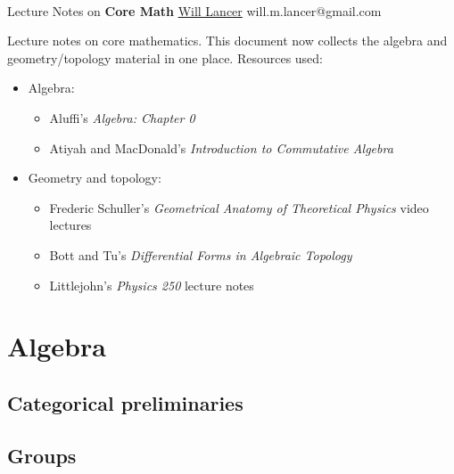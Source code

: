 \documentclass[11pt]{article}
\begin{document}
\thispagestyle{empty}
\bigskip \
\vspace{0.1cm}

\begin{center}
{\fontsize{22}{22} \selectfont Lecture Notes on}
\vskip 16pt
{\fontsize{36}{36} \selectfont \bf \sffamily Core Math}
\vskip 24pt
{\fontsize{18}{18} \selectfont \rmfamily \href{https://will-lancer.github.io}{Will Lancer}}
\vskip 6pt
{\fontsize{14}{14} \selectfont \ttfamily will.m.lancer@gmail.com}
\vskip 24pt
\end{center}

{\parindent0pt \baselineskip=15.5pt}
\noin
Lecture notes on core mathematics. This document now collects the algebra and
geometry/topology material in one place. Resources used:
\begin{itemize}
    \item Algebra:
    \begin{itemize}
        \item Aluffi's \emph{Algebra: Chapter 0}
        \item Atiyah and MacDonald's \emph{Introduction to Commutative Algebra}
    \end{itemize}
    \item Geometry and topology:
    \begin{itemize}
        \item Frederic Schuller's \emph{Geometrical Anatomy of Theoretical Physics}
        video lectures
        \item Bott and Tu's \emph{Differential Forms in Algebraic Topology}
        \item Littlejohn's \emph{Physics 250} lecture notes
    \end{itemize}
\end{itemize}

\newpage
\microtoc
\newpage

\section{Algebra}

\subsection{Categorical preliminaries}


\subsection{Groups}
\end{document}
